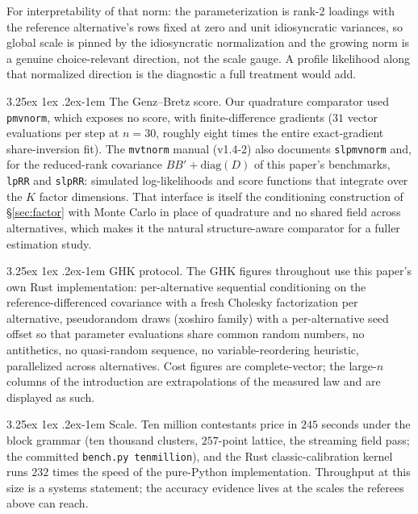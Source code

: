 \documentclass[11pt]{article}
\makeatletter
\renewcommand\paragraph{\@startsection{paragraph}{4}{\z@}%
  {3.25ex \@plus1ex \@minus.2ex}{-1em}%
  {\normalfont\normalsize\itshape}}
\makeatother
\begin{document}
For interpretability of that norm: the parameterization is rank-2
loadings with the reference alternative's rows fixed at zero and unit
idiosyncratic variances, so global scale is pinned by the idiosyncratic
normalization and the growing norm is a genuine choice-relevant
direction, not the scale gauge. A profile likelihood along that
normalized direction is the diagnostic a full treatment would add.

\paragraph{The Genz--Bretz score.} Our quadrature comparator used
\texttt{pmvnorm}, which exposes no score, with finite-difference gradients
($31$ vector evaluations per step at $n=30$, roughly eight times the entire
exact-gradient share-inversion fit). The \texttt{mvtnorm} manual (v1.4-2)
also documents \texttt{slpmvnorm} and, for the reduced-rank covariance
$BB'+\mathrm{diag}(D)$ of this paper's benchmarks, \texttt{lpRR} and
\texttt{slpRR}: simulated log-likelihoods and score functions that
integrate over the $K$ factor dimensions. That interface is itself the
conditioning construction of \S\ref{sec:factor} with Monte Carlo in place
of quadrature and no shared field across alternatives, which makes it the
natural structure-aware comparator for a fuller estimation study.

\paragraph{GHK protocol.} The GHK figures throughout use this paper's own
Rust implementation: per-alternative sequential conditioning on the
reference-differenced covariance with a fresh Cholesky factorization per
alternative, pseudorandom draws (xoshiro family) with a per-alternative
seed offset so that parameter evaluations share common random numbers, no
antithetics, no quasi-random sequence, no variable-reordering heuristic,
parallelized across alternatives. Cost figures are complete-vector; the
large-$n$ columns of the introduction are extrapolations of the measured
law and are displayed as such.

\paragraph{Scale.} Ten million contestants price in $245$ seconds under the
block grammar (ten thousand clusters, $257$-point lattice, the streaming
field pass; the committed \texttt{bench.py tenmillion}), and the Rust
classic-calibration kernel runs $232$ times the speed of the pure-Python
implementation. Throughput at this size is a systems statement; the accuracy
evidence lives at the scales the referees above can reach.
\end{document}
